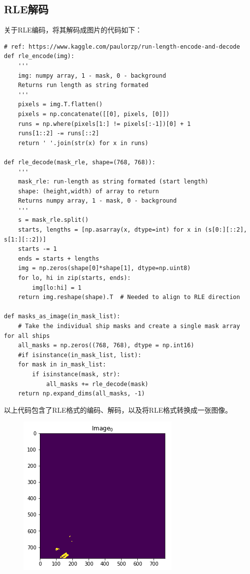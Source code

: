 \subsection{RLE解码}

关于RLE编码，将其解码成图片的代码如下：

\begin{verbatim}
# ref: https://www.kaggle.com/paulorzp/run-length-encode-and-decode
def rle_encode(img):
    '''
    img: numpy array, 1 - mask, 0 - background
    Returns run length as string formated
    '''
    pixels = img.T.flatten()
    pixels = np.concatenate([[0], pixels, [0]])
    runs = np.where(pixels[1:] != pixels[:-1])[0] + 1
    runs[1::2] -= runs[::2]
    return ' '.join(str(x) for x in runs)

def rle_decode(mask_rle, shape=(768, 768)):
    '''
    mask_rle: run-length as string formated (start length)
    shape: (height,width) of array to return 
    Returns numpy array, 1 - mask, 0 - background
    '''
    s = mask_rle.split()
    starts, lengths = [np.asarray(x, dtype=int) for x in (s[0:][::2], s[1:][::2])]
    starts -= 1
    ends = starts + lengths
    img = np.zeros(shape[0]*shape[1], dtype=np.uint8)
    for lo, hi in zip(starts, ends):
        img[lo:hi] = 1
    return img.reshape(shape).T  # Needed to align to RLE direction

def masks_as_image(in_mask_list):
    # Take the individual ship masks and create a single mask array for all ships
    all_masks = np.zeros((768, 768), dtype = np.int16)
    #if isinstance(in_mask_list, list):
    for mask in in_mask_list:
        if isinstance(mask, str):
            all_masks += rle_decode(mask)
    return np.expand_dims(all_masks, -1)
\end{verbatim}

以上代码包含了RLE格式的编码、解码，以及将RLE格式转换成一张图像。

\begin{figure}
\centering
\includegraphics{preprocessing_pic/1.png}
\caption{}
\end{figure}

